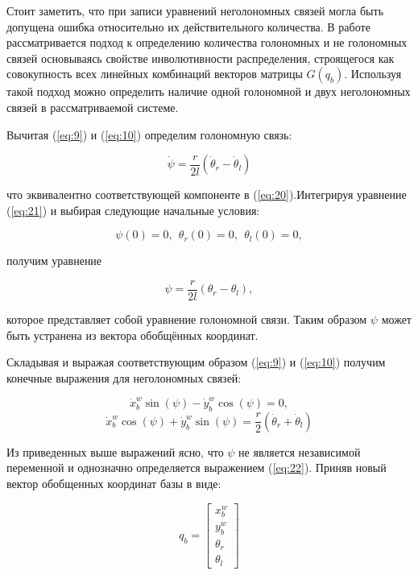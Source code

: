 \documentclass[14pt, a4paper]{extreport}
\begin{document}
Стоит заметить, что при записи уравнений неголономных связей могла быть допущена ошибка относительно их действительного количества. В работе \cite{Li} рассматривается подход к определению количества голономных и не голономных связей основываясь свойстве инволютивности распределения, строящегося как совокупность всех линейных комбинаций векторов матрицы $G(q_b)$. Используя такой подход можно определить наличие одной голономной и двух неголономных связей в рассматриваемой системе.

Вычитая (\ref{eq:9}) и (\ref{eq:10}) определим голономную связь:

\begin{equation}
\dot{\psi} = \frac{r}{2l}(\dot{\theta}_r - \dot{\theta}_l)
\tag{21} \label{eq:21}
\end{equation}

\noindent
что эквивалентно соответствующей компоненте в (\ref{eq:20}).Интегрируя уравнение (\ref{eq:21}) и выбирая следующие начальные условия:

\[
\psi(0) = 0,\ \ \theta_r(0) = 0,\ \ \theta_l(0) = 0,
\]

\noindent
получим уравнение

\begin{equation}
\psi = \frac{r}{2l}(\theta_r - \theta_l),
\tag{22} \label{eq:22}
\end{equation}

\noindent
которое представляет собой уравнение голономной связи. Таким образом $\psi$ может быть устранена из вектора обобщённых координат.

Складывая и выражая соответствующим образом (\ref{eq:9}) и (\ref{eq:10}) получим конечные выражения для неголономных связей:

\begin{equation}
\dot{x}^w_b\sin(\psi) - \dot{y}^w_b\cos(\psi) = 0,
\tag{23} \label{eq:23}
\end{equation}
\begin{equation}
\dot{x}^w_b\cos(\psi) + \dot{y}^w_b\sin(\psi) = \frac{r}{2}(\dot{\theta}_r + \dot{\theta}_l)
\tag{24} \label{eq:24}
\end{equation}

Из приведенных выше выражений ясно, что $\psi$ не является независимой переменной и однозначно определяется выражением (\ref{eq:22}). Приняв новый вектор обобщенных координат базы в виде:

\begin{equation}
q_b = 
\begin{bmatrix}
x^w_b\\[1mm] y^w_b\\[1mm] \theta_r\\[1mm] \theta_l
\end{bmatrix}
\tag{25} \label{eq:25}
\end{equation}
\end{document}
